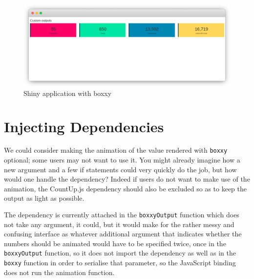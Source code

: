 \documentclass[
]{krantz}
\begin{document}
\begin{figure}[t]

{\centering \includegraphics[width=1\linewidth]{images/custom-output-boxxy} 

}

\caption{Shiny application with boxxy}\label{fig:boxxy-custom}
\end{figure}

\hypertarget{shiny-output-inject}{%
\section{Injecting Dependencies}\label{shiny-output-inject}}

We could consider making the animation of the value rendered with \texttt{boxxy} optional; some users may not want to use it. You might already imagine how a new argument and a few if statements could very quickly do the job, but how would one handle the dependency? Indeed if users do not want to make use of the animation, the CountUp.js dependency should also be excluded so as to keep the output as light as possible.

The dependency is currently attached in the \texttt{boxxyOutput} function which does not take any argument, it could, but it would make for the rather messy and confusing interface as whatever additional argument that indicates whether the numbers should be animated would have to be specified twice, once in the \texttt{boxxyOutput} function, so it does not import the dependency as well as in the \texttt{boxxy} function in order to serialise that parameter, so the JavaScript binding does not run the animation function.
\end{document}
